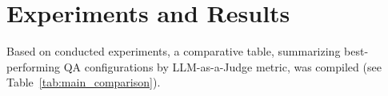 \section{Experiments and Results}




Based on conducted experiments, a comparative table, summarizing best-performing QA configurations by LLM-as-a-Judge metric, was compiled (see Table~\ref{tab:main_comparison}).

